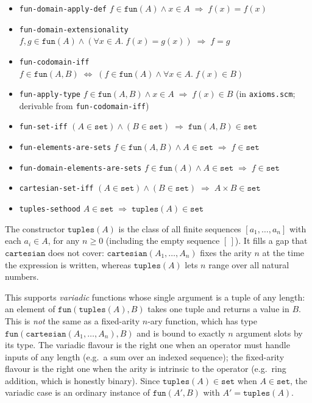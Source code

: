 \begin{itemize}
\item \texttt{fun-domain-apply-def}
  $f \in \mathtt{fun}(A) \land x \in A \;\Rightarrow\; f(x) = f(x)$
\item \texttt{fun-domain-extensionality}
  $f,g \in \mathtt{fun}(A) \land (\forall x \in A.\;f(x) = g(x)) \;\Rightarrow\; f = g$
\item \texttt{fun-codomain-iff}
  $f \in \mathtt{fun}(A,B) \;\Leftrightarrow\;
   (f \in \mathtt{fun}(A) \land \forall x \in A.\;f(x) \in B)$
\item \texttt{fun-apply-type}
  $f \in \mathtt{fun}(A,B) \land x \in A \;\Rightarrow\; f(x) \in B$
  (in \texttt{axioms.scm}; derivable from \texttt{fun-codomain-iff})
\item \texttt{fun-set-iff}
  $(A \in \mathtt{set}) \land (B \in \mathtt{set}) \;\Rightarrow\; \mathtt{fun}(A,B) \in \mathtt{set}$
\item \texttt{fun-elements-are-sets}
  $f \in \mathtt{fun}(A,B) \land A \in \mathtt{set} \;\Rightarrow\; f \in \mathtt{set}$
\item \texttt{fun-domain-elements-are-sets}
  $f \in \mathtt{fun}(A) \land A \in \mathtt{set} \;\Rightarrow\; f \in \mathtt{set}$
\item \texttt{cartesian-set-iff}
  $(A \in \mathtt{set}) \land (B \in \mathtt{set}) \;\Rightarrow\; A \times B \in \mathtt{set}$
\item \texttt{tuples-sethood}
  $A \in \mathtt{set} \;\Rightarrow\; \mathtt{tuples}(A) \in \mathtt{set}$
\end{itemize}

\begin{remark}
The constructor $\mathtt{tuples}(A)$ is the class of all finite sequences
$[a_1, \ldots, a_n]$ with each $a_i \in A$, for any $n \ge 0$ (including
the empty sequence $[\,]$).  It fills a gap that $\mathtt{cartesian}$ does
not cover: $\mathtt{cartesian}(A_1, \ldots, A_n)$ fixes the arity $n$ at
the time the expression is written, whereas $\mathtt{tuples}(A)$ lets $n$
range over all natural numbers.

This supports \emph{variadic} functions whose single argument is a tuple
of any length: an element of $\mathtt{fun}(\mathtt{tuples}(A), B)$ takes
one tuple and returns a value in $B$.  This is \emph{not} the same as a
fixed-arity $n$-ary function, which has type
$\mathtt{fun}(\mathtt{cartesian}(A_1, \ldots, A_n), B)$ and is bound to
exactly $n$ argument slots by its type.  The variadic flavour is the
right one when an operator must handle inputs of any length (e.g.\ a sum
over an indexed sequence); the fixed-arity flavour is the right one when
the arity is intrinsic to the operator (e.g.\ ring addition, which is
honestly binary).  Since $\mathtt{tuples}(A) \in \mathtt{set}$ when
$A \in \mathtt{set}$, the variadic case is an ordinary instance of
$\mathtt{fun}(A', B)$ with $A' = \mathtt{tuples}(A)$.
\end{remark}

